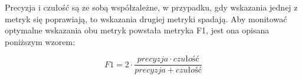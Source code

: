 Precyzja i czułość są ze sobą współzależne, w przypadku, gdy wskazania jednej z metryk się poprawiają, to wskazania drugiej metryki spadają. Aby monitować optymalne wskazania obu metryk powstała metryka F1, jest ona opisana poniższym wzorem:

$$
    F1 = 2 \cdot \frac{precyzja \cdot czułość}{precyzja + czułość}
$$








